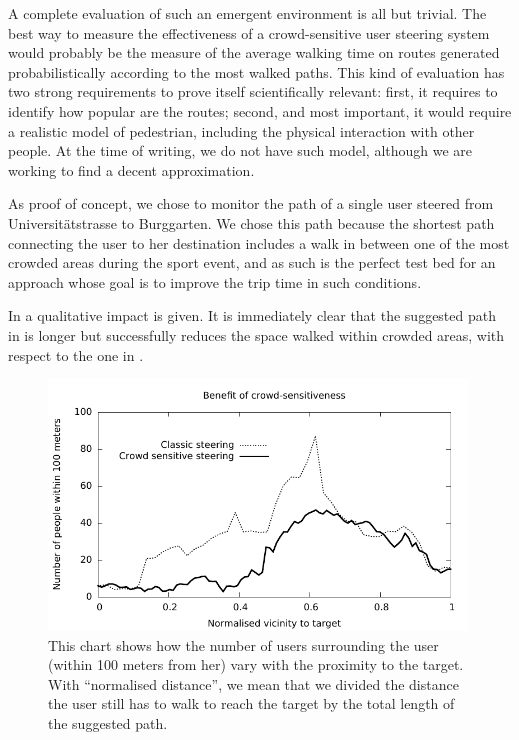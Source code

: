 \documentclass[12pt,a4paper,twoside,openright]{book}
\begin{document}
A complete evaluation of such an emergent environment is all but trivial.
%
The best way to measure the effectiveness of a crowd-sensitive user steering system would probably be the measure of the average walking time on routes generated probabilistically according to the most walked paths.
%
This kind of evaluation has two strong requirements to prove itself scientifically relevant: first, it requires to identify how popular are the routes; second, and most important, it would require a realistic model of pedestrian, including the physical interaction with other people.
%
At the time of writing, we do not have such model, although we are working to find a decent approximation.

As proof of concept, we chose to monitor the path of a single user steered from Universit\"{a}tstrasse to Burggarten.
%
We chose this path because the shortest path connecting the user to her destination includes a walk in between one of the most crowded areas during the sport event, and as such is the perfect test bed for an approach whose goal is to improve the trip time in such conditions.

In  a qualitative impact is given.
%
It is immediately clear that the suggested path in  is longer but successfully reduces the space walked within crowded areas, with respect to the one in .

\begin{figure}
 \includegraphics[width=0.99\textwidth]{img/ahpc-chart}
 \caption[Urban crowd steering effectiveness]{This chart shows how the number of users surrounding the user (within 100 meters from her) vary with the proximity to the target.
%
 With ``normalised distance'', we mean that we divided the distance the user still has to walk to reach the target by the total length of the suggested path.
 }
 \label{img:ahpc-chart}
\end{figure}
\end{document}
